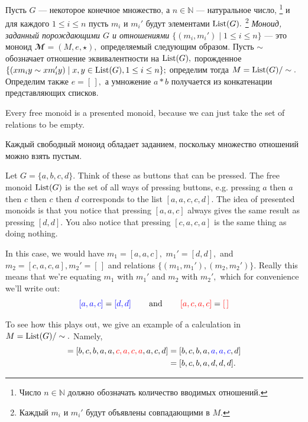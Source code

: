 \documentclass[../main/CT4S-EN-RU]{subfiles}
\begin{document}
\begin{definitionRUS}\label{def:presented monoid}
Пусть $G$ — некоторое конечное множество, а $n\in{ℕ}$ — натуральное число,%
\footnote{Число $n\in{ℕ}$ должно обозначать количество вводимых отношений.}
и для каждого $1\leq i\leq n$ пусть $m_i$ и $m_i'$ будут элементами $\operatorname{List}(G).$%
\footnote{Каждый $m_i$ и $m_i'$ будут объявлены совпадающими в $M.$}
{\em Моноид, заданный порождающими $G$ и отношениями $\{(m_i,m_i'){\;|\;}1\leq i\leq n\}$} — это моноид ${𝓜}=(M,e,{⋆}),$ определяемый следующим образом. Пусть $\sim$ обозначает отношение эквивалентности на $\operatorname{List}(G),$ порожденное $\{(xm_iy\sim xm_i'y){\;|\;}x,y\in\operatorname{List}(G), 1\leq i\leq n\};$ определим тогда $M=\operatorname{List}(G)/\sim.$ Определим также $e=[\,],$ а умножение $a * b$ получается из конкатенации представляющих списков. 
\end{definitionRUS}

\begin{remarkENG}
Every free monoid is a presented monoid, because we can just take the set of relations to be empty.
\end{remarkENG}

\begin{remarkRUS}
Каждый свободный моноид обладает заданием, поскольку множество отношений можно взять пустым.
\end{remarkRUS}

\begin{exampleENG}\label{ex:presented monoid}
Let $G=\{a,b,c,d\}.$ Think of these as buttons that can be pressed. The free monoid $\operatorname{List}(G)$ is the set of all ways of pressing buttons, e.g. pressing $a$ then $a$ then $c$ then $c$ then $d$ corresponds to the list $[a,a,c,c,d].$ The idea of presented monoids is that you notice that pressing $[a,a,c]$ always gives the same result as pressing $[d,d].$ You also notice that pressing $[c,a,c,a]$ is the same thing as doing nothing.

In this case, we would have $m_1=[a,a,c],$ $m_1'=[d,d],$ and $m_2=[c,a,c,a], m_2'=[\,]$ and relations $\{(m_1,m_1'), (m_2,m_2')\}.$ Really this means that we're equating $m_1$ with $m_1'$ and $m_2$ with $m_2',$ which for convenience we'll write out:
$${\color{blue}{[a,a,c]}}={\color{blue}{[d,d]}}\hspace{.3in}\textnormal{and}\hspace{.3in}{\color{red}{[a,c,a,c]}}={\color{red}{[\,]}}
$$

To see how this plays out, we give an example of a calculation in $M=\operatorname{List}(G)/\sim.$ Namely,
\begin{align*}
[b,c,b,{\color{blue}{d,d}},a,c,a,a,c,d] = [b,c,b,a,a,{\color{red}{c,a,c,a}},a,c,d] &= [b,c,b,a,{\color{blue}{a,a,c}},d]\\
&= [b,c,b,a,d,d,d].
\end{align*}
\end{exampleENG}
\end{document}
